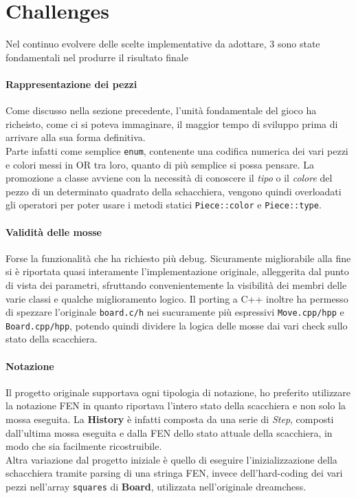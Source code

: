 \documentclass{article}
\begin{document}
    \section{Challenges}\label{sec:challenges}
        Nel continuo evolvere delle scelte implementative da adottare, 3 sono state fondamentali nel produrre il risultato finale
        \paragraph{Rappresentazione dei pezzi}
            Come discusso nella sezione precedente, l'unità fondamentale del gioco ha richeisto, come ci si poteva immaginare, il maggior tempo di sviluppo prima di arrivare alla sua forma definitiva.\\
            Parte infatti come semplice \texttt{enum}, contenente una codifica numerica dei vari pezzi e colori messi in OR tra loro, quanto di più semplice si possa pensare. La promozione a classe avviene con la necessità di conoscere il \textit{tipo} o il \textit{colore} del pezzo di un determinato quadrato della schacchiera, vengono quindi overloadati gli operatori per poter usare i metodi statici \texttt{Piece::color} e \texttt{Piece::type}.
        \paragraph{Validità delle mosse}
            Forse la funzionalità che ha richiesto più debug.
            Sicuramente migliorabile alla fine si è riportata quasi interamente l'implementazione originale, alleggerita dal punto di vista dei parametri, sfruttando convenientemente la visibilità dei membri delle varie classi e qualche miglioramento logico.
            Il porting a C++ inoltre ha permesso di spezzare l'originale \texttt{board.c/h} nei sucuramente più espressivi \texttt{Move.cpp/hpp} e \texttt{Board.cpp/hpp}, potendo quindi dividere la logica delle mosse dai vari check sullo stato della scacchiera. 
        \paragraph{Notazione}
            Il progetto originale supportava ogni tipologia di notazione, ho preferito utilizzare la notazione FEN in quanto riportava l'intero stato della scacchiera e non solo la mossa eseguita.
            La \textbf{History} è infatti composta da una serie di \textit{Step}, composti dall'ultima mossa eseguita e dalla FEN dello stato attuale della scacchiera, in modo che sia facilmente ricostruibile.\\
            Altra variazione dal progetto iniziale è quello di eseguire l'inizializzazione della schacchiera tramite parsing di una stringa FEN, invece dell'hard-coding dei vari pezzi nell'array \texttt{squares} di \textbf{Board}, utilizzata nell'originale dreamchess.
\end{document}
